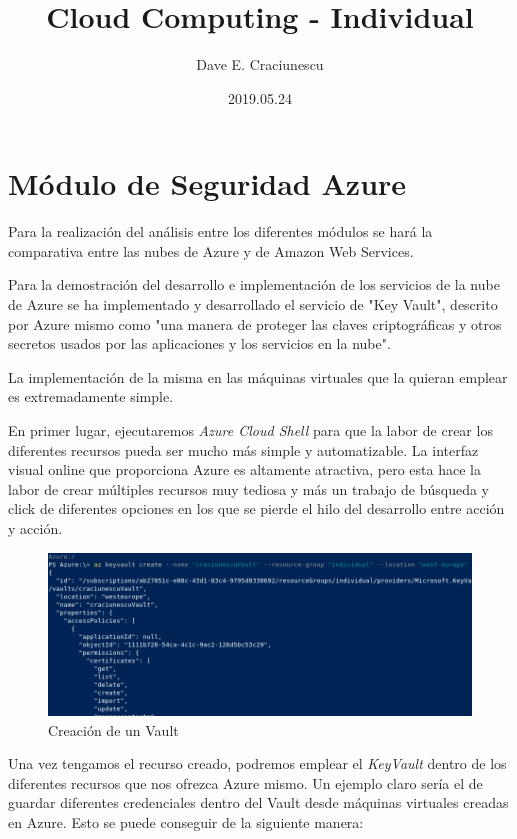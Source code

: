 \documentclass{article}
\title{Cloud Computing - Individual}
\author{Dave E. Craciunescu}
\date{2019.05.24}
\begin{document}
\maketitle

\section*{Módulo de Seguridad Azure}

Para la realización del análisis entre los diferentes módulos se hará la
comparativa entre las nubes de Azure y de Amazon Web Services.

Para la demostración del desarrollo e implementación de los servicios de la nube
de Azure se ha implementado y desarrollado el servicio de "Key Vault", descrito
por Azure mismo como "una manera de proteger las claves criptográficas y otros
secretos usados por las aplicaciones y los servicios en la nube".

La implementación de la misma en las máquinas virtuales que la quieran emplear
es extremadamente simple.

En primer lugar, ejecutaremos \textit{Azure Cloud Shell} para que la labor de
crear los diferentes recursos pueda ser mucho más simple y automatizable. La
interfaz visual online que proporciona Azure es altamente atractiva, pero esta
hace la labor de crear múltiples recursos muy tediosa y más un trabajo de
búsqueda y click de diferentes opciones en los que se pierde el hilo del
desarrollo entre acción y acción.

\begin{figure}[h!]
    \includegraphics[width=\linewidth]{./Selection_011.png}
    \caption{Creación de un Vault}
\end{figure}

Una vez tengamos el recurso creado, podremos emplear el \textit{KeyVault} dentro
de los diferentes recursos que nos ofrezca Azure mismo. Un ejemplo claro sería
el de guardar diferentes credenciales dentro del Vault desde máquinas virtuales
creadas en Azure. Esto se puede conseguir de la siguiente manera:
\end{document}
